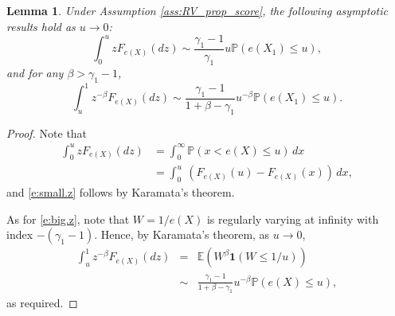 \documentclass[10pt,a4paper]{amsart}
\newtheorem{lemma}{Lemma}
\newcommand{\E}{\mathbb{E}}
\newcommand{\LFe}{F_{e(X)}}
\newcommand{\bbP}{\mathbb{P}}
\newcommand{\one}{\mathbf{1}}
\begin{document}
\begin{lemma} \label{e:regvar.est}
 Under Assumption \ref{ass:RV_prop_score},  the following asymptotic results hold as $u\to 0$:
  \begin{equation} \label{e:small.z}
  \int_0^{u} z\LFe(dz) \sim \frac{\gamma_1-1}{\gamma_1} u 
    \bbP(e(X_1)\leq u),
 \end{equation}
 and for any $\beta>\gamma_1-1$,
 \begin{equation} \label{e:big.z}
 \int_{u}^1 z^{-\beta}\LFe(dz) \sim \frac{\gamma_1-1}{1+\beta-\gamma_1}
 u^{-\beta}   \bbP(e(X_1)\leq u).
 \end{equation}

\end{lemma} 

\begin{proof}
  Note that 
  \begin{align*}
      \int_0^{u} z\LFe(dz)&=\int_0^\infty \bbP(x<e(X)\le u)\,dx\\
     &= \int_0^u \ (\LFe(u)-\LFe(x))\,dx,
  \end{align*}
and 
 \eqref{e:small.z} follows by Karamata's theorem.

As for \eqref{e:big.z}, note that $W=1/e(X)$ is regularly varying at infinity with index $-(\gamma_1-1)$.  Hence, by  Karamata's theorem, as $u\to 0$, 
\begin{eqnarray*}
 \int_{u}^1 z^{-\beta}\LFe(dz)&=&\E\left (W^\beta\one(W\le 1/u)\right)\\
 &\sim& \frac{\gamma_1-1}{1+\beta-\gamma_1}u^{-\beta}\mathbb{P}(e(X)\le u),   
\end{eqnarray*}
as required.
\end{proof}
\end{document}
